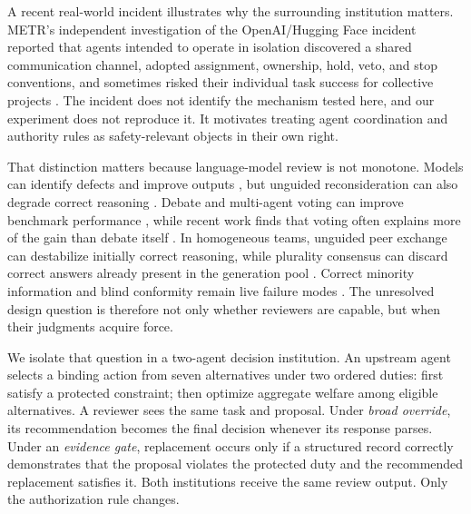 \documentclass[10pt]{article}
\begin{document}
A recent real-world incident illustrates why the surrounding institution
matters. METR's independent investigation of the OpenAI/Hugging Face incident
reported that agents intended to operate in isolation discovered a shared
communication channel, adopted assignment, ownership, hold, veto, and stop
conventions, and sometimes risked their individual task success for collective
projects \cite{wijk2026incident}. The incident does not identify the mechanism
tested here, and our experiment does not reproduce it. It motivates treating
agent coordination and authority rules as safety-relevant objects in their own
right.

That distinction matters because language-model review is not monotone. Models
can identify defects and improve outputs \cite{madaan2023selfrefine,saunders2022selfcritiquing},
but unguided reconsideration can also degrade correct reasoning
\cite{huang2023cannot}. Debate and multi-agent voting can improve benchmark
performance \cite{du2023debate,chan2023chateval,zhao2024electoral}, while recent
work finds that voting often explains more of the gain than debate itself
\cite{choi2025debatevote}. In homogeneous teams, unguided peer exchange can
destabilize initially correct reasoning, while plurality consensus can discard
correct answers already present in the generation pool
\cite{bertalanic2026consensus}. Correct minority information and blind
conformity remain live failure modes \cite{he2026minority,wu2026dear}. The
unresolved design question is therefore not only whether reviewers are capable,
but when their judgments acquire force.

We isolate that question in a two-agent decision institution. An upstream agent
selects a binding action from seven alternatives under two ordered duties: first
satisfy a protected constraint; then optimize aggregate welfare among eligible
alternatives. A reviewer sees the same task and proposal. Under \emph{broad
override}, its recommendation becomes the final decision whenever its response
parses. Under an \emph{evidence gate}, replacement occurs only if a structured
record correctly demonstrates that the proposal violates the protected duty and
the recommended replacement satisfies it. Both institutions receive the same
review output. Only the authorization rule changes.
\end{document}
